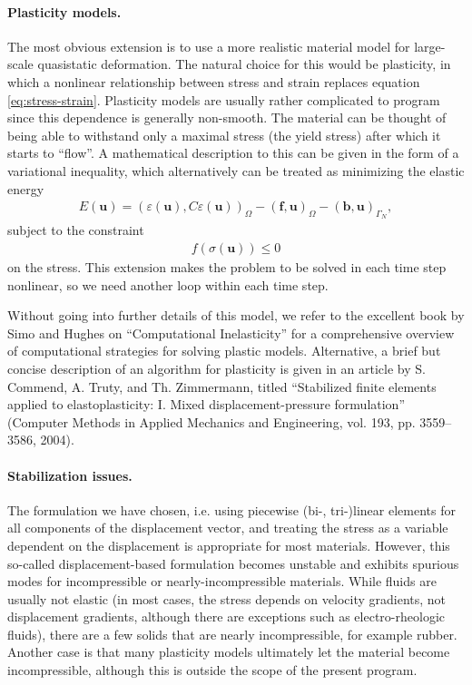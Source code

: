 \documentclass{article}
\renewcommand{\vec}[1]{\mathbf{#1}}
\begin{document}
\paragraph*{Plasticity models.} The most obvious extension is to use a more
realistic material model for large-scale quasistatic deformation. The natural
choice for this would be plasticity, in which a nonlinear relationship between
stress and strain replaces equation \eqref{eq:stress-strain}. Plasticity
models are usually rather complicated to program since this dependence is
generally non-smooth. The material can be thought of being able to withstand
only a maximal stress (the yield stress) after which it starts to ``flow''. A
mathematical description to this can be given in the form of a variational
inequality, which alternatively can be treated as minimizing the elastic
energy
\begin{gather}
  E(\vec u) = 
  (\varepsilon(\vec u), C\varepsilon(\vec u))_{\Omega}
  - (\vec f, \vec u)_{\Omega} - (\vec b, \vec u)_{\Gamma_N},
\end{gather}
subject to the constraint
\begin{gather}
  f(\sigma(\vec u)) \le 0
\end{gather}
on the stress. This extension makes the problem to be solved in each time step
nonlinear, so we need another loop within each time step.

Without going into further details of this model, we refer to the excellent
book by Simo and Hughes on ``Computational Inelasticity'' for a
comprehensive overview of computational strategies for solving plastic
models. Alternative, a brief but concise description of an algorithm for
plasticity is given in an article by S. Commend, A. Truty, and Th. Zimmermann,
titled ``Stabilized finite elements applied to 
elastoplasticity: I. Mixed displacement-pressure formulation''
(Computer Methods in Applied Mechanics and Engineering, vol. 193,
pp. 3559--3586, 2004).


\paragraph*{Stabilization issues.} The formulation we have chosen, i.e. using
piecewise (bi-, tri-)linear elements for all components of the displacement
vector, and treating the stress as a variable dependent on the displacement is
appropriate for most materials. However, this so-called displacement-based
formulation becomes unstable and exhibits spurious modes for incompressible or
nearly-incompressible materials. While fluids are usually not elastic (in most
cases, the stress depends on velocity gradients, not displacement gradients,
although there are exceptions such as electro-rheologic fluids), there are a
few solids that are nearly incompressible, for example rubber. Another case is
that many plasticity models ultimately let the material become incompressible,
although this is outside the scope of the present program.
\end{document}
